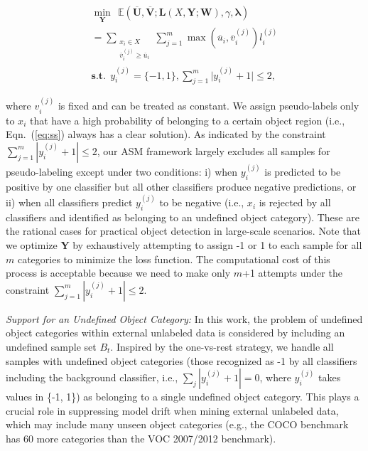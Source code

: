 \documentclass[journal]{IEEEtran}
\begin{document}
{\begin{small}
\begin{equation}
\label{eq:ss}
		\begin{gathered}
		\underset{ \mathbf{Y}}{\min} \
		\  
		\mathbb{E}(\mathbf{\overline{U}},\mathbf{\overline{V}}; \mathbf{L}(X, \mathbf{Y};\mathbf{W}), \gamma, {\bm \lambda}) \\
		= \underset{\substack{x_i\in X\\\overline{v}^{(j)}_i\geq\overline{u}_i}}{\sum}\sum_{j=1}^{m}\max(\overline{u}_i,\overline{v}^{(j)}_i)l^{(j)}_i \\		
		\mathbf{s.t.} \ \ y^{(j)}_i = \{-1,1\},	\sum_{j=1}^{m} \vert y_{i}^{(j)} + 1 \vert \le 2,
		\end{gathered}
		\end{equation}
\end{small}where $v_i^{(j)}$ is fixed and can be treated as constant. We assign pseudo-labels only to $x_i$ that have a high probability of belonging to a certain object region (i.e., Eqn.~(\ref{eq:ss}) always has a clear solution). As indicated by the constraint $\sum_{j=1}^{m}|y^{(j)}_i+1|\leq 2$, our {ASM} framework largely excludes all samples for pseudo-labeling except under two conditions: i) when $y_{i}^{(j)}$ is predicted to be positive by one classifier but all {other classifiers produce negative predictions, or ii) when all} classifiers predict $y_{i}^{(j)}$ to be negative (i.e., $x_{i}$ is rejected by all classifiers and identified as {belonging to an} undefined object category). These are the rational cases for practical object detection in large-scale scenarios. {Note that we optimize $\mathbf{Y}$ by exhaustively attempting to assign -1 or 1 to each sample for all $m$ categories to minimize the loss function. The computational cost of this process is acceptable because we need to make only $m$+1 attempts under the constraint $\sum_{j=1}^{m}|y^{(j)}_i+1|\leq 2$.}


\textit{Support for an Undefined Object Category:} In this work, the problem of undefined object categories within external unlabeled data is considered by including an undefined sample set $B_t$. Inspired by the {one-vs-rest} strategy, we handle {all samples with undefined} object categories (those recognized as -1 by all classifiers including the background classifier, i.e., $\sum_j |y_i^{(j)} +1| =0$, where $y_i^{(j)}$ takes values in \{-1, 1\}) as belonging to a single undefined object category. This plays a crucial role in suppressing model drift when mining external unlabeled data, which may include many unseen object categories (e.g., the COCO benchmark has 60 more categories than the VOC 2007/2012 benchmark). 

}
\end{document}
